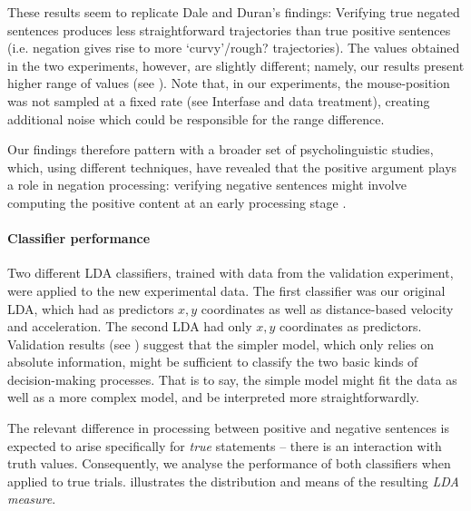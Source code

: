 \documentclass{article}
\newcommand{\nbMM}[1]{{\leavevmode\color{red}{\scriptsize#1}}}
\newcommand{\addMM}[1]{{\leavevmode\color{red}#1}}
\begin{document}
These results seem to replicate Dale and Duran's findings: Verifying true negated sentences produces less straightforward trajectories than true positive sentences (i.e. negation gives rise to more `curvy'/\addMM{rough?} trajectories). The values obtained in the two experiments, however, are slightly different; namely, our results present higher range of values (see ). 
Note that, in our experiments, the mouse-position was not sampled at a fixed rate (see Interfase and data treatment), creating additional noise which could be responsible for the range difference\nbMM{maybe foonote?}. 

Our findings therefore pattern with a broader set of psycholinguistic studies, which, using different techniques, have revealed that the positive argument plays a role in negation processing: verifying negative sentences might involve computing the positive content at an early processing stage \citep{Tian2016}. 

\paragraph{Classifier performance}
Two different LDA classifiers, trained with data from the validation experiment, were applied to the new experimental data. The first classifier was our original LDA, which had as predictors $x,y$ coordinates as well as distance-based velocity and acceleration. The second LDA had only $x,y$ coordinates as predictors. Validation results (see ) suggest that the simpler model, which only relies on absolute information, might be sufficient to classify the two basic kinds of decision-making processes. That is to say, the simple model might fit the data as well as a more complex model, and be interpreted more straightforwardly. 

The relevant difference in processing between positive and negative sentences is expected to arise specifically for \emph{true} statements -- there is an interaction with truth values. Consequently, we analyse the performance of both classifiers when applied to true trials.  illustrates the distribution and means of the resulting \textit{LDA measure}. 
\end{document}
